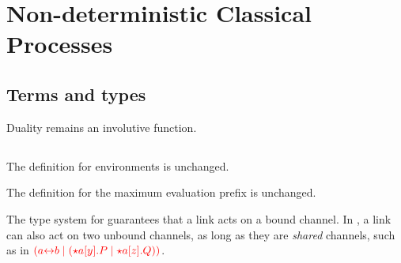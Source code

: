 \chapter{Non-deterministic Classical Processes}\label{sec:main}
\section{Terms and types}



Duality remains an involutive function.

\section{}




The definition for environments is unchanged.







The definition for the maximum evaluation prefix is unchanged.

The type system for \cp guarantees that a link acts on a bound channel. In
\nodcap, a link can also act on two unbound channels, as long as they are
\emph{shared} channels, such as in
$\textcolor{red}{(a{\leftrightarrow}b \mid ({\star}{a}[y].P \mid {\star}{a}[z].Q))}$.








